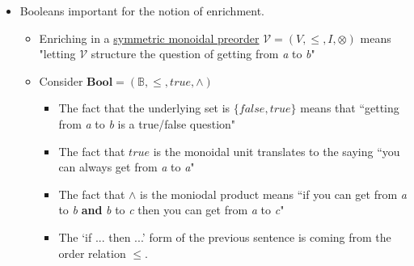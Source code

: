 \begin{itemize}
    \item Booleans important for the notion of enrichment.
          \begin{itemize}
            \item Enriching in a \href{doc/1 math/Seven Sketches in Compositionality/Chapter 2: Resource theories/2 Symmetric monoidal preorders/1 Definition and first examples/1 Symmetric monoidal structure on a preorder}{symmetric monoidal preorder} $\mathcal{V}=(V,\leq,I,\otimes)$ means "letting $\mathcal{V}$ structure the question of getting from \emph{a} to \emph{b}"
            \item Consider $\mathbf{Bool}=(\mathbb{B},\leq,true,\land)$
                  \begin{itemize}
                    \item The fact that the underlying set is $\{false, true\}$ means that ``getting from \emph{a} to \emph{b} is a true/false question"
                    \item The fact that $true$ is the monoidal unit translates to the saying ``you can always get from \emph{a} to \emph{a}"
                    \item The fact that $\land$ is the moniodal product means ``if you can get from \emph{a} to \emph{b} \textbf{and} \emph{b} to \emph{c} then you can get from \emph{a} to \emph{c}"
                    \item The `if ... then ...' form of the previous sentence is coming from the order relation $\leq$.    \end{itemize}

          \end{itemize}
  \end{itemize}

